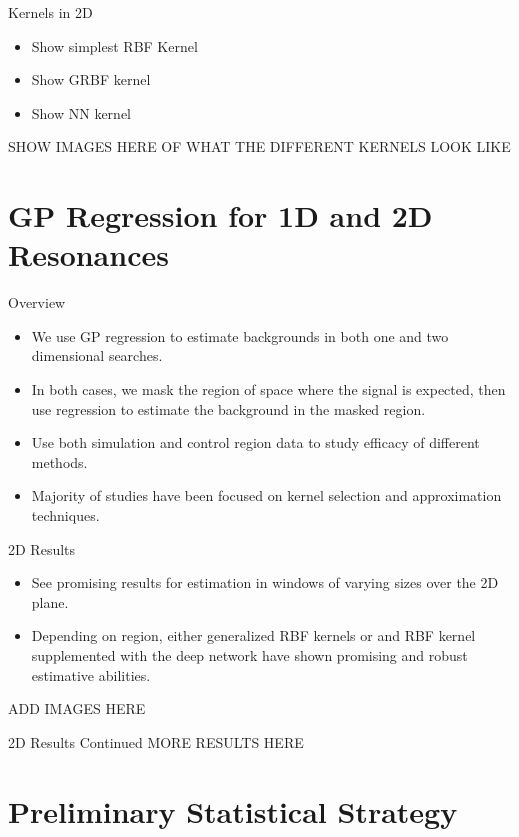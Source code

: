 \documentclass[10pt]{beamer}
\begin{document}
\begin{frame}{Kernels in 2D}
  \begin{itemize}
  \item Show simplest RBF Kernel
  \item Show GRBF kernel
  \item Show NN kernel
  \end{itemize}

  SHOW IMAGES HERE OF WHAT THE DIFFERENT KERNELS LOOK LIKE
\end{frame}

\section[Results]{GP Regression for 1D and 2D Resonances}
\label{sec:results-1d-2d}

\begin{frame}{Overview}
  \begin{itemize}
  \item We use GP regression to estimate backgrounds in both one and two dimensional searches.
  \item In both cases, we mask the region of space where the signal is expected, then use regression to estimate the background in the masked region.
  \item Use both simulation and control region data to study efficacy of different methods. 
  \item Majority of studies have been focused on kernel selection and approximation techniques.
  \end{itemize}
\end{frame}

\begin{frame}{2D Results}
  \begin{itemize}
  \item See promising results for estimation in windows of varying sizes over the 2D plane. 
  \item Depending on region, either generalized RBF kernels or and RBF kernel supplemented with the deep network have shown promising and robust estimative abilities.
  \end{itemize}

  ADD IMAGES HERE
\end{frame}

\begin{frame}{2D Results  Continued}
  MORE RESULTS HERE
\end{frame}

\section[Statistical Considerations]{Preliminary Statistical Strategy}
\end{document}
